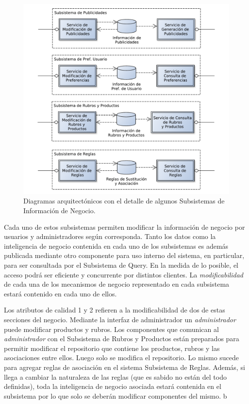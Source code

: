 \begin{figure}[H]
	\centering
	\includegraphics[width=\textwidth]{graficos/arch/subsistemas_neg.pdf}
	\caption{Diagramas arquitectónicos con el detalle de algunos \textsf{Subsistemas de Información de Negocio}.}
\end{figure}

Cada uno de estos subsistemas permiten modificar la información de negocio por usuarios y administradores según corresponda. Tanto los datos como la inteligencia de negocio contenida en cada uno de los subsistemas es además publicada mediante otro componente para uso interno del sistema, en particular, para ser consultada por el \textsf{Subsistema de Query}. En la medida de lo posible, el acceso podrá ser eficiente y concurrente por distintos clientes. La \emph{modificabilidad} de cada una de los mecanismos de negocio representado en cada subsistema estará contenido en cada uno de ellos.

Los atributos de calidad 1 y 2 refieren a la modificabilidad de dos de estas secciones del negocio. Mediante la \textsf{interfaz de administrador} un \emph{administrador} puede modificar productos y rubros. Los componentes que comunican al \emph{administrador} con el \textsf{Subsistema de Rubros y Productos} están preparados para permitir modificar el repositorio que contiene los productos, rubros y las asociaciones entre ellos. Luego solo se modifica el repositorio. Lo mismo sucede para agregar reglas de asociación en el sistema \textsf{Subsistema de Reglas}. Además, si llega a cambiar la naturaleza de las reglas (que es sabido no están del todo definidas), toda la inteligencia de negocio asociada estará contenida en el subsistema por lo que solo se deberán modificar componentes del mismo.
b

